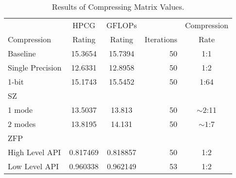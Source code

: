 \begin{table}
	\centering
	\begin{tabular}{l|S[table-format=2.6]|S[table-format=2.6]|r|c}
		            & {HPCG}   & {GFLOPs} &            & Compression \\
		Compression & {Rating} & {Rating} & Iterations & Rate \\
		\hline
		Baseline & 15.3654 & 15.7394 & 50 & 1:1 \\ %
		Single Precision & 12.6331 & 12.8958 & 50 & 1:2 \\
		1-bit & 15.1743 & 15.5452 & 50 & 1:64 \\ %
		SZ & & & & \\
		\hspace{3mm} 1 mode & 13.5037 & 13.813 & 50 & \(\sim 2\):11 \\
		\hspace{3mm} 2 modes & 13.8195 & 14.131 & 50 & \(\sim 1\):7 \\
		ZFP & & & & \\
		\hspace{3mm}High Level API & 0.817469 & 0.818857 & 50 & 1:2 \\
		\hspace{3mm}Low Level API & 0.960338 & 0.962149 & 53 & 1:2 \\
	\end{tabular}
	\caption{Results of Compressing Matrix Values.}
	\label{tab:results-val}
\end{table}
